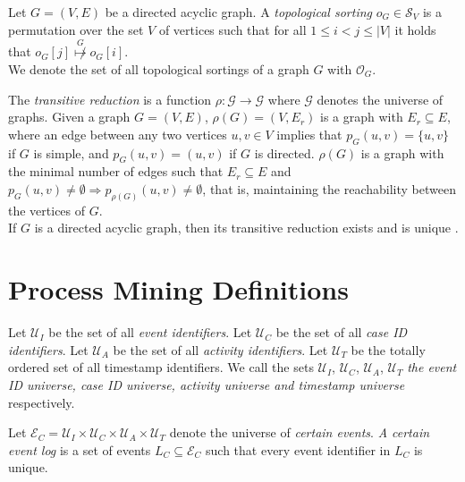 \begin{definition}\label{def: topological sorting}
Let $G=(V,E)$ be a directed acyclic graph.
A \emph{topological sorting} $o_G \in \mathcal{S}_V$ is a permutation over the set $V$ of vertices such that for all $1 \leq i < j \leq |V|$ it holds that $o_G[j] \overset{G}{\not \mapsto} o_G[i]$.\\
We denote the set of all topological sortings of a graph $G$ with $\mathcal{O}_G$.
\end{definition}
\pagebreak

\begin{definition}
The \emph{transitive reduction} is a function $\rho: \mathcal{G} \to \mathcal{G} $ where $\mathcal{G}$ denotes the universe of graphs.
Given a graph $G=(V,E)$, $\rho(G)=(V,E_r)$ is a graph with $E_r \subseteq E$, where an edge between any two vertices $u,v \in V$ implies that $p_G(u,v)=\{u,v\}$ if $G$ is simple, and $p_G(u,v)=(u,v)$ if $G$ is directed. 
$\rho(G)$ is a graph with the minimal number of edges such that $E_r \subseteq E$ and $p_G(u,v) \neq \emptyset \Rightarrow p_{\rho(G)}(u,v) \neq \emptyset$, that is, maintaining the reachability between the vertices of $G$.\\
If $G$ is a directed acyclic graph, then its transitive reduction exists and is unique \cite{transitive}.
\end{definition}
%
%
%
%
%
%
\section{Process Mining Definitions}

\begin{definition}
Let $\mathcal{U}_I$ be the set of all \emph{event identifiers}.
Let $\mathcal{U}_C$ be the set of all \emph{case ID identifiers}.
Let $\mathcal{U}_A$ be the set of all \emph{activity identifiers}.
Let $\mathcal{U}_T$ be the totally ordered set of all timestamp identifiers.
We call the sets $\mathcal{U}_I$, $\mathcal{U}_C$, $\mathcal{U}_A$, $\mathcal{U}_T$ \emph{the event ID universe, case ID universe, activity universe and timestamp universe} respectively.
\end{definition}

\begin{definition}
Let $\mathcal{E}_C = \mathcal{U}_I \times \mathcal{U}_C \times \mathcal{U}_A \times \mathcal{U}_T$ denote the universe of  \emph{certain events}.
\emph{A certain event log} is a set of events $L_C \subseteq \mathcal{E}_C$ such that every event identifier in $L_C$ is unique.
\end{definition}


